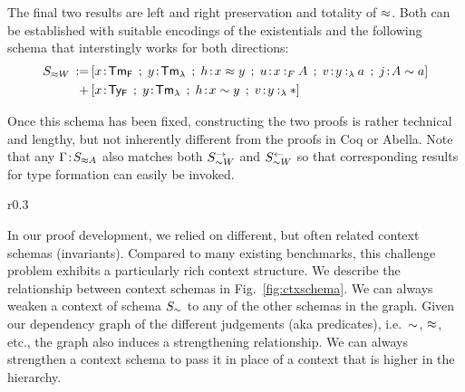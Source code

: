 The final two results are left and right preservation and totality of $\mathrel{\approx}$.
Both can be established with suitable encodings of the existentials and the following schema that interstingly works for both directions:
\begin{align*}
  S_{\tmr W} \eqdef &[x\of\TmF \mrel{;} y\of\TmL \mrel{;} h\of x \tmr y \mrel{;} u\of\typingFh{x}{A} \mrel{;} v\of\typingLh{y}{a} \mrel{;} j \of A \tyr a]\\
  \mrel{+} &[x\of\TyF \mrel{;} y\of\TmL \mrel{;} h\of x \tyr y \mrel{;} v\of\typingLh{y}{\Prp}]
\end{align*}

Once this schema has been fixed, constructing the two proofs is rather technical and lengthy, but not inherently different from the proofs in Coq or Abella.
Note that any $\Gamma \!:\! S_{\mathrel{\approx} A}$ also matches both $S_{\mathrel{\sim} W}^{\rightarrow}$ and $S_{\mathrel{\sim} W}^{\leftarrow}$ so that corresponding results for type formation can easily be invoked.


\begin{wrapfigure}{r}{0.3\textwidth}
  \centering
\begin{minipage}{4.5cm}
  \end{minipage}
  \caption{Dependencies between Context Schemas}
  \label{fig:ctxschema}
\end{wrapfigure}
In our proof development, we relied on different, but often related context schemas (invariants).
Compared to many existing benchmarks, this challenge problem exhibits a particularly rich context structure.
We describe the relationship between context schemas in Fig.~\ref{fig:ctxschema}. We can always weaken a context of schema $S_{\mathrel{\sim}}$ to any of the other schemas in the graph. Given our dependency graph of the different judgements (aka predicates), i.e.~$\mathrel{\sim}$, $\mathrel{\approx}$, etc., the graph also induces a strengthening relationship. We can always strengthen a context schema to pass it in place of a context that is higher in the hierarchy.






